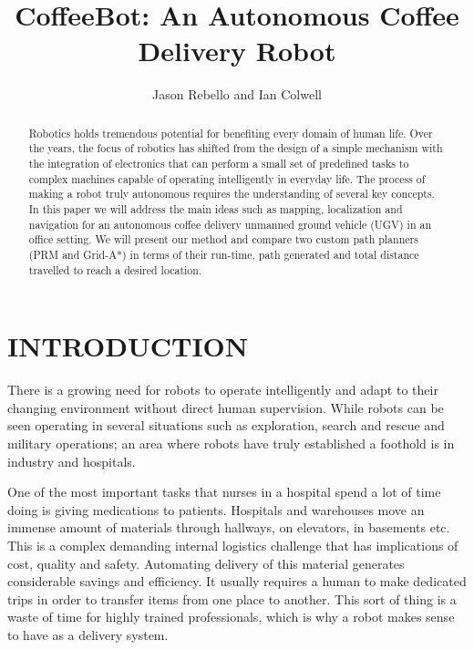 \documentclass[letterpaper, 10 pt, conference]{ieeeconf}  %
\title{\LARGE \bf
CoffeeBot: An Autonomous Coffee Delivery Robot
}
\author{Jason Rebello and Ian Colwell%
}
\begin{document}
\maketitle
\thispagestyle{plain}
\pagestyle{plain}


\begin{abstract}

Robotics holds tremendous potential for benefiting every domain of human life. Over the years, the focus of robotics has shifted from the design of a simple mechanism with the integration of electronics that can perform a small set of predefined tasks to complex machines capable of operating intelligently in everyday life. The process of making a robot truly autonomous requires the understanding of several key concepts. In this paper we will address the main ideas such as mapping, localization and navigation for an autonomous coffee delivery unmanned ground vehicle (UGV) in an office setting. We will present our method and compare two custom path planners (PRM and Grid-A*) in terms of their run-time, path generated and total distance travelled to reach a desired location.

\end{abstract}

\section{INTRODUCTION}

There is a growing need for robots to operate intelligently and adapt to their changing environment without direct human supervision. While robots can be seen operating in several situations such as exploration, search and rescue and military operations; an area where robots have truly established a foothold is in industry and hospitals.

One of the most important tasks that nurses in a hospital spend a lot of time doing is giving medications to patients. Hospitals and warehouses move an immense amount of materials through hallways, on elevators, in basements etc. This is a complex demanding internal logistics challenge that has implications of cost, quality and safety. Automating delivery of this material generates considerable savings and efficiency. It usually requires a human to make dedicated trips in order to transfer items from one place to another. This sort of thing is a waste of time for highly trained professionals, which is why a robot makes sense to have as a delivery system.
\end{document}
